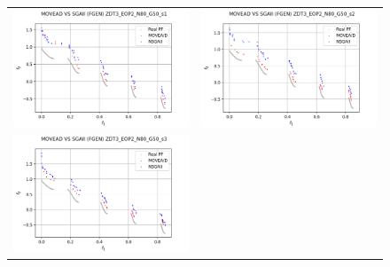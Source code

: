 \begin{figure}[H]
    \centering
    \begin{tabular}{c c}
    \includegraphics[scale=0.5]{figures/ZDT3_EOP2_N80_G50_T12/s1_comp.png} &
    \includegraphics[scale=0.5]{figures/ZDT3_EOP2_N80_G50_T12/s2_comp.png}\\
    \includegraphics[scale=0.5]{figures/ZDT3_EOP2_N80_G50_T12/s3_comp.png} &

\end{tabular}
\end{figure}
